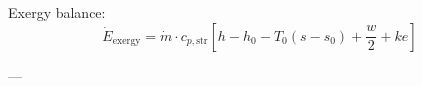 Exergy balance:  
\[
\dot{E}_{\text{exergy}} = \dot{m} \cdot c_{p,\text{str}} \left[ h - h_0 - T_0(s - s_0) + \frac{w}{2} + ke \right]
\]  

---
